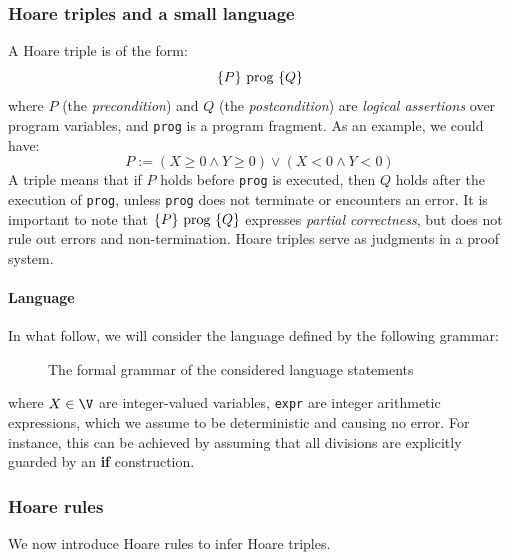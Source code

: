 \documentclass[toc, titlepaged]{../cs-classes/cs-classes}
\begin{document}
\subsubsection{Hoare triples and a small language}
\begin{definition}
    A Hoare triple is of the form:
    \begin{equation*}
        \{P\} \textnormal{ prog } \{Q\}
    \end{equation*}
    where $P$ (the \emph{precondition}) and $Q$ (the \emph{postcondition}) are \emph{logical assertions} over program variables, and \texttt{prog} is a program fragment. As an example, we could have:
    \begin{equation*}
        P := (X \geq 0 \land Y \geq 0) \lor (X<0 \land Y<0)
    \end{equation*}
    A triple means that if $P$ holds before \texttt{prog} is executed, then $Q$ holds after the execution of \texttt{prog}, unless \texttt{prog} does not terminate or encounters an error. It is important to note that $\{P\} \textnormal{ prog } \{Q\}$ expresses \emph{partial correctness}, but does not rule out errors and non-termination. Hoare triples serve as judgments in a proof system.
\end{definition}

\paragraph*{Language}
In what follow, we will consider the language defined by the following grammar:
\begin{figure}[H]
    \centering
    \begin{grammar}
    \end{grammar}
    \caption{The formal grammar of the considered language statements}
\end{figure}
where $X\in\V$ are integer-valued variables, \texttt{expr} are integer arithmetic expressions, which we assume to be deterministic and causing no error. For instance, this can be achieved by assuming that all divisions are explicitly guarded by an \textbf{if} construction.

\subsubsection{Hoare rules}
We now introduce Hoare rules to infer Hoare triples.
\end{document}
